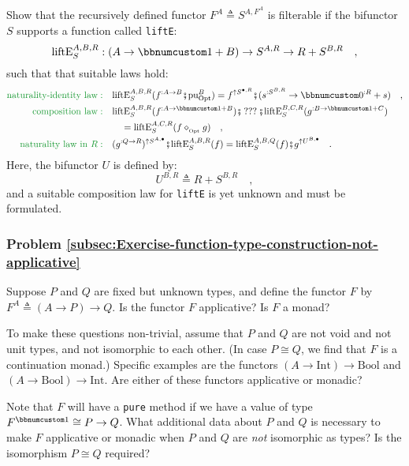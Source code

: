 Show that the recursively defined functor $F^{A}\triangleq S^{A,F^{A}}$
is filterable if the bifunctor $S$ supports a function called \lstinline!liftE!:
\[
\text{liftE}_{S}^{A,B,R}:(A\rightarrow\bbnum 1+B)\rightarrow S^{A,R}\rightarrow R+S^{B,R}\quad,
\]
such that that suitable laws hold:
\begin{align*}
{\color{greenunder}\text{naturality-identity law}:}\quad & \text{liftE}_{S}^{A,B,R}(f^{:A\rightarrow B}\bef\text{pu}_{\text{Opt}}^{B})=f^{\uparrow S^{\bullet,R}}\bef(s^{:S^{B,R}}\rightarrow\bbnum 0^{:R}+s)\quad,\\
{\color{greenunder}\text{composition law}:}\quad & \text{liftE}_{S}^{A,B,R}(f^{:A\rightarrow\bbnum 1+B})\bef\,???\,\bef\text{liftE}_{S}^{B,C,R}(g^{:B\rightarrow\bbnum 1+C})\\
 & \quad=\text{liftE}_{S}^{A,C,R}(f\diamond_{_{\text{Opt}}}g)\quad,\\
{\color{greenunder}\text{naturality law in }R:}\quad & (g^{:Q\rightarrow R})^{\uparrow S^{A,\bullet}}\bef\text{liftE}_{S}^{A,B,R}(f)=\text{liftE}_{S}^{A,B,Q}(f)\bef g^{\uparrow U^{B,\bullet}}\quad.
\end{align*}
Here, the bifunctor $U$ is defined by:
\[
U^{B,R}\triangleq R+S^{B,R}\quad,
\]
and a suitable composition law for \lstinline!liftE! is yet unknown
and must be formulated.

\subsubsection{Problem \label{subsec:Exercise-function-type-construction-not-applicative}\ref{subsec:Exercise-function-type-construction-not-applicative}}

Suppose $P$ and $Q$ are fixed but unknown types, and define the
functor $F$ by $F^{A}\triangleq(A\rightarrow P)\rightarrow Q$. Is
the functor $F$ applicative? Is $F$ a monad?

To make these questions non-trivial, assume that $P$ and $Q$ are
not void and not unit types, and not isomorphic to each other. (In
case $P\cong Q$, we find that $F$ is a continuation monad.) Specific
examples are the functors $(A\rightarrow\text{Int})\rightarrow\text{Bool}$
and $(A\rightarrow\text{Bool})\rightarrow\text{Int}$. Are either
of these functors applicative or monadic?

Note that $F$ will have a \lstinline!pure! method if we have a value
of type $F^{\bbnum 1}\cong P\rightarrow Q$. What additional data
about $P$ and $Q$ is necessary to make $F$ applicative or monadic
when $P$ and $Q$ are \emph{not} isomorphic as types? Is the isomorphism
$P\cong Q$ required?

